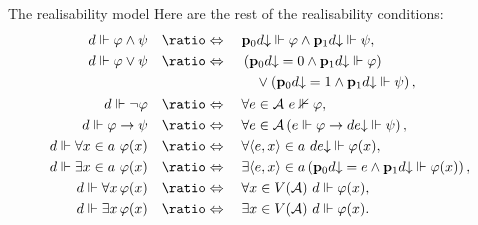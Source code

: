 \documentclass{beamer}
\newcommand\tuple[1]{\left\langle #1 \right\rangle}
\begin{document}
\begin{frame}{The realisability model}
  Here are the rest of the realisability conditions:
  \begin{align*}
    d \Vdash \varphi \land \psi \quad                        & \ratio\Leftrightarrow \quad \mathbf{p}_0 d {\downarrow} \Vdash \varphi \land \mathbf{p}_1 d {\downarrow} \Vdash \psi,                                                   \\
    d \Vdash \varphi \lor \psi \quad                         & \ratio\Leftrightarrow \quad \begin{aligned}[t]
                                                                                              & \left(\mathbf{p}_0 d {\downarrow} = 0 \land \mathbf{p}_1 d {\downarrow} \Vdash \varphi\right)             \\
                                                                                              & \quad {} \lor \left(\mathbf{p}_0 d {\downarrow} = 1 \land \mathbf{p}_1 d {\downarrow} \Vdash \psi\right),
                                                                                           \end{aligned}                                \\
    d \Vdash \neg \varphi \quad                              & \ratio\Leftrightarrow \quad \forall e \in \mathcal{A} \ e \nVdash \varphi,                                                                                              \\
    d \Vdash \varphi \rightarrow \psi \quad                  & \ratio\Leftrightarrow \quad \forall e \in \mathcal{A} \left(e \Vdash \varphi \rightarrow de {\downarrow} \Vdash \psi\right),                                            \\
    d \Vdash \forall x \in a \ \varphi\mleft(x\mright) \quad & \ratio\Leftrightarrow \quad \forall {\tuple{e, x} \in a} \ de {\downarrow} \Vdash \varphi\mleft(x\mright),                                                              \\
    d \Vdash \exists x \in a \ \varphi\mleft(x\mright) \quad & \ratio\Leftrightarrow \quad \exists {\tuple{e, x} \in a} \left(\mathbf{p}_0 d {\downarrow} = e \land \mathbf{p}_1 d {\downarrow} \Vdash \varphi\mleft(x\mright)\right), \\
    d \Vdash \forall x \, \varphi\mleft(x\mright) \quad      & \ratio\Leftrightarrow \quad \forall x \in V\mleft(\mathcal{A}\mright) \ d \Vdash \varphi\mleft(x\mright),                                                               \\
    d \Vdash \exists x \, \varphi\mleft(x\mright) \quad      & \ratio\Leftrightarrow \quad \exists x \in V\mleft(\mathcal{A}\mright) \ d \Vdash \varphi\mleft(x\mright).
  \end{align*}
\end{frame}
\end{document}
